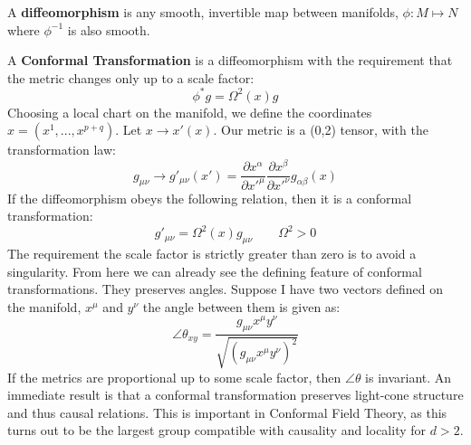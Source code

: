 \documentclass{article}
\begin{document}
A \textbf{diffeomorphism} is any smooth, invertible map between manifolds, $\phi : M \longmapsto N$ where $\phi^{-1}$ is also smooth. 

A \textbf{Conformal Transformation} is a diffeomorphism with the requirement that the metric changes only up to a scale factor: 
\begin{equation}
    \phi^*g = \Omega^2(x)g
\end{equation}
Choosing a local chart on the manifold, we define the coordinates $x = (x^1,...,x^{p+q})$. Let $x\longrightarrow x'(x)$. Our metric is a (0,2) tensor, with the transformation law: 
\begin{equation}
    g_{\mu\nu} \longrightarrow g'_{\mu\nu}(x') = \frac{\partial x^\alpha}{\partial x'^\mu}\frac{\partial x^\beta}{\partial x'^\nu}g_{\alpha\beta}(x)
\end{equation}
If the diffeomorphism obeys the following relation, then it is a conformal transformation: 
\begin{equation}
    g'_{\mu\nu} = \Omega^2(x)g_{\mu\nu} \qquad \Omega^2 > 0 
\end{equation}
The requirement the scale factor is strictly greater than zero is to avoid a singularity. From here we can already see the defining feature of conformal transformations. They preserves angles. Suppose I have two vectors defined on the manifold, $x^\mu$ and $y^\nu$ the angle between them is given as:
\begin{equation}
    \angle\theta_{xy} = \frac{g_{\mu\nu }x^\mu y^\nu}{\sqrt{(g_{\mu\nu}x^\mu y^\nu)^2}}
\end{equation}
If the metrics are proportional up to some scale factor, then $\angle\theta$ is invariant. An immediate result is that a conformal transformation preserves light-cone structure and thus causal relations. This is important in Conformal Field Theory, as this turns out to be the largest group compatible with causality and locality for $d>2$.
\end{document}
